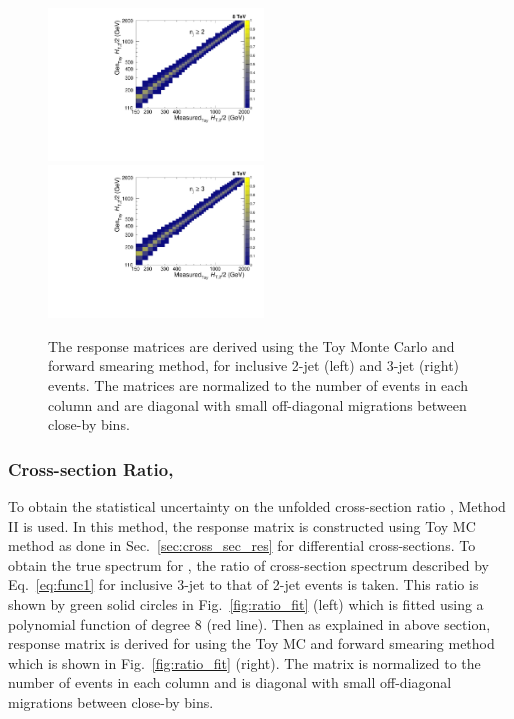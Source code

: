 \begin{figure}[!htbp]
 \begin{center}
 \includegraphics[width=0.51\textwidth]{Plots_HT_2_150/Normalized_Response_Matrix_NLO_2_range_column.pdf}%
 ~~\includegraphics[width=0.51\textwidth]{Plots_HT_2_150/Normalized_Response_Matrix_NLO_3_column.pdf} 
 \caption[The response matrices are derived using the Toy Monte Carlo and forward smearing method.]{The response matrices are derived using the Toy Monte Carlo and forward smearing method, for inclusive 2-jet (left) and 3-jet (right) events. The matrices are normalized to the number of events in each column and are diagonal with small off-diagonal migrations between close-by \httwo bins.}
 \label{fig:response_NLO}
 \end{center}
\end{figure}

\subsubsection{Cross-section Ratio, \texorpdfstring{\ratio}{R-32)}}
To obtain the statistical uncertainty on the unfolded cross-section ratio \rations, Method II is used. In this method, the response matrix is constructed using Toy MC method as done in Sec.~\ref{sec:cross_sec_res} for differential cross-sections. To obtain the true spectrum for \rations, the ratio of cross-section spectrum described by Eq.~\ref{eq:func1} for inclusive 3-jet to that of 2-jet events is taken. This ratio is shown by green solid circles in Fig.~\ref{fig:ratio_fit} (left) which is fitted using a polynomial function of degree 8 (red line). Then as explained in above section, response matrix is derived for \ratio using the Toy MC and forward smearing method which is shown in Fig.~\ref{fig:ratio_fit} (right). The matrix is normalized to the number of events in each column and is diagonal with small off-diagonal migrations between close-by \httwo bins.

